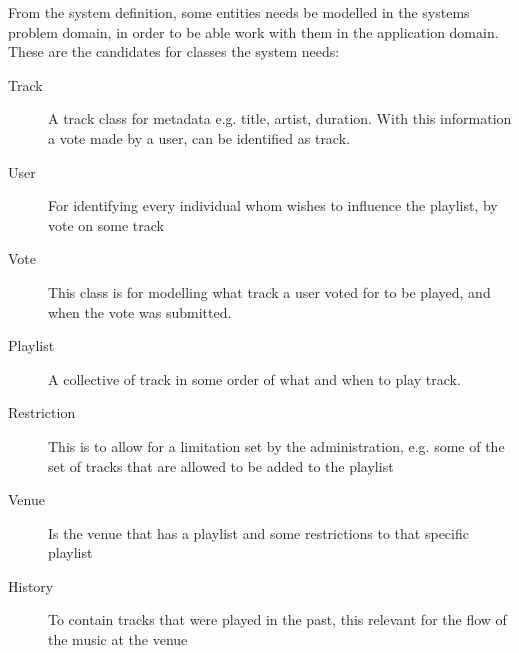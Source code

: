 From the system definition, some entities needs be modelled in the systems problem domain, in order to be able work with them in the application domain. These are the candidates for classes the system needs:
\begin{description}
    \item[Track]
    A track class for metadata e.g. title, artist, duration. With this information a vote made by a user, can be identified as track.
    \item[User]
    For identifying every individual whom wishes to influence the playlist, by vote on some track
    \item[Vote]
    This class is for modelling what track a user voted for to be played, and when the vote was submitted.
    \item[Playlist]
    A collective of track in some order of what and when to play track.
    \item[Restriction]
    This is to allow for a limitation set by the administration, e.g. some of the set of tracks that are allowed to be added to the playlist
    \item[Venue]
    Is the venue that has a playlist and some restrictions to that specific playlist
    \item[History]
    To contain tracks that were played in the past, this relevant for the flow of the music at the venue
\end{description}
